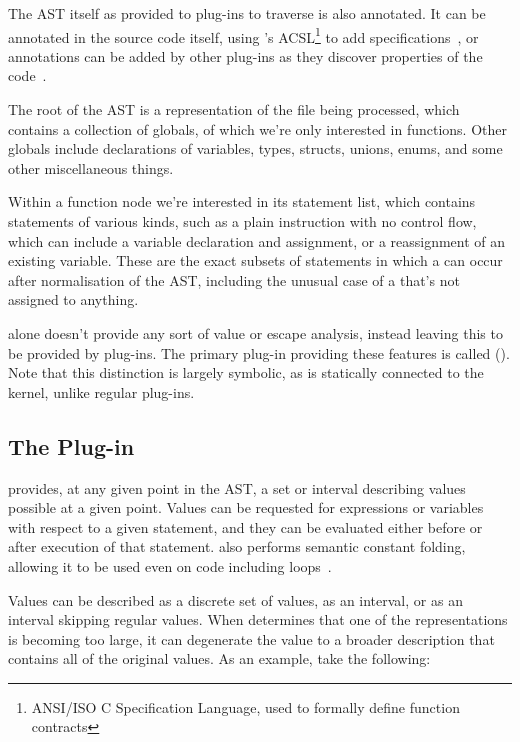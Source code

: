 The AST itself as provided to plug-ins to traverse is also annotated. It can be annotated in the source code itself, using 's ACSL\footnote{ANSI/ISO C Specification Language, used to formally define function contracts} to add specifications~\cite{framaacsl}, or annotations can be added by other plug-ins as they discover properties of the code~\cite{framaplug}.

The root of the AST is a representation of the file being processed, which contains a collection of globals, of which we're only interested in functions. Other globals include declarations of variables, types, structs, unions, enums, and some other miscellaneous things.

Within a function node we're interested in its statement list, which contains statements of various kinds, such as a plain instruction with no control flow, which can include a variable declaration and assignment, or a reassignment of an existing variable. These are the exact subsets of statements in which a \malloc{} can occur after normalisation of the AST, including the unusual case of a \malloc{} that's not assigned to anything.

 alone doesn't provide any sort of value or escape analysis, instead leaving this to be provided by plug-ins. The primary plug-in providing these features is called  (). Note that this distinction is largely symbolic, as  is statically connected to the  kernel, unlike regular plug-ins.

\subsection{The  Plug-in} \label{EVA}

 provides, at any given point in the AST, a set or interval describing values possible at a given point. Values can be requested for expressions or variables with respect to a given statement, and they can be evaluated either before or after execution of that statement.  also performs semantic constant folding, allowing it to be used even on code including loops~\cite{framaeva}.

Values can be described as a discrete set of values, as an interval, or as an interval skipping regular values. When  determines that one of the representations is becoming too large, it can degenerate the value to a broader description that contains all of the original values. As an example, take the following:

